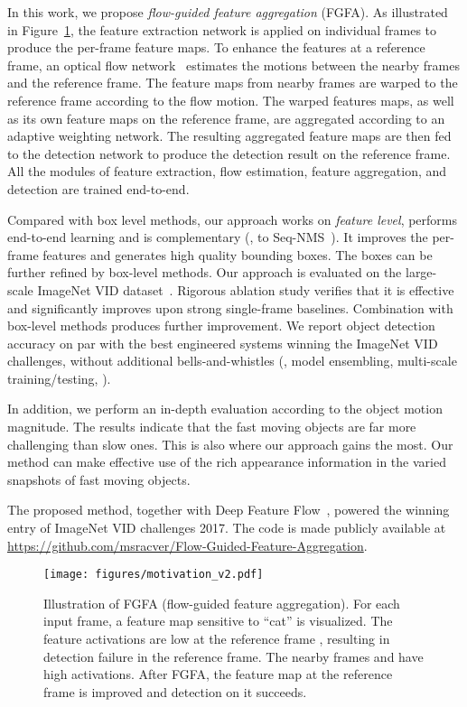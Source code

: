 \documentclass[10pt,twocolumn,letterpaper]{article}
\begin{document}
In this work, we propose \emph{flow-guided feature aggregation} (FGFA). As illustrated in Figure~\ref{fig.motivation}, the feature extraction network is applied on individual frames to produce the per-frame feature maps. To enhance the features at a reference frame, an optical flow network~\cite{dosovitskiy2015flownet} estimates the motions between the nearby frames and the reference frame. The feature maps from nearby frames are warped to the reference frame according to the flow motion. The warped features maps, as well as its own feature maps on the reference frame, are aggregated according to an adaptive weighting network. The resulting aggregated feature maps are then fed to the detection network to produce the detection result on the reference frame. All the modules of feature extraction, flow estimation, feature aggregation, and detection are trained end-to-end.

Compared with box level methods, our approach works on \emph{feature level}, performs end-to-end learning and is complementary (\eg, to Seq-NMS~\cite{han2016seqnms}). It improves the per-frame features and generates high quality bounding boxes. The boxes can be further refined by box-level methods. Our approach is evaluated on the large-scale ImageNet VID dataset~\cite{russakovsky2015imagenet}. Rigorous ablation study verifies that it is effective and significantly improves upon strong single-frame baselines. Combination with box-level methods produces further improvement. We report object detection accuracy on par with the best engineered systems winning the ImageNet VID challenges, without additional bells-and-whistles (\eg, model ensembling, multi-scale training/testing, \etc).

In addition, we perform an in-depth evaluation according to the object motion magnitude. The results indicate that the fast moving objects are far more challenging than slow ones. This is also where our approach gains the most. Our method can make effective use of the rich appearance information in the varied snapshots of fast moving objects.

The proposed method, together with Deep Feature Flow~\cite{zhu2016dff}, powered the winning entry of ImageNet VID challenges 2017. The code is made publicly available at \url{https://github.com/msracver/Flow-Guided-Feature-Aggregation}.

\begin{figure}
\begin{center}
\texttt{[image: figures/motivation\_v2.pdf]}
\end{center}
\label{fig.motivation}
\caption{Illustration of FGFA (flow-guided feature aggregation). For each input frame, a feature map sensitive to ``cat'' is visualized. The feature activations are low at the reference frame , resulting in detection failure in the reference frame. The nearby frames  and  have high activations. After FGFA, the feature map at the reference frame is improved and detection on it succeeds.} \vspace{-0.7em}
\end{figure}
\end{document}
